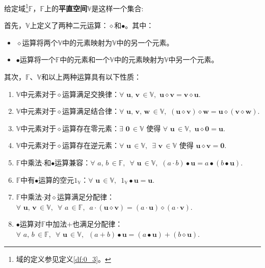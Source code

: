 \documentclass[12pt,UTF8]{ctexbook}
\begin{document}
\begin{df}\label{df:1_1}
给定域\footnote{域的定义参见定义\ref{df:0_3}。}$\mathbb{F}$，$\mathbb{F}$上的\textbf{平直空间}$\mathbb{V}$是这样一个集合:

首先，$\mathbb{V}$上定义了两种二元运算：$\diamond$和$\bullet$。其中：
\begin{itemize}
    \item $\diamond$运算将两个$\mathbb{V}$中的元素映射为$\mathbb{V}$中的另一个元素。
    \item $\bullet$运算将一个$\mathbb{F}$中的元素和一个$\mathbb{V}$中的元素映射为$\mathbb{V}$中另一个元素。
\end{itemize}
其次，$\mathbb{F}$、$\mathbb{V}$和以上两种运算具有以下性质：
\begin{enumerate}
    \item $\mathbb{V}$中元素对于$\diamond$运算满足交换律：$\forall \,\, \mathbf{u}, \, \mathbf{v} \, \in \mathbb{V}, \,\, \mathbf{u} \diamond \mathbf{v} = \mathbf{v} \diamond \mathbf{u}.$
    \item $\mathbb{V}$中元素对于$\diamond$运算满足结合律：$\forall \,\, \mathbf{u}, \, \mathbf{v}, \, \mathbf{w} \, \in \mathbb{V}, \,\, (\mathbf{u} \diamond \mathbf{v}) \diamond \mathbf{w} = \mathbf{u} \diamond (\mathbf{v} \diamond \mathbf{w}).$
    \item $\mathbb{V}$中元素对于$\diamond$运算存在零元素：$\exists \,\, \mathbf{0} \, \in \mathbb{V}$ 使得 $\forall \,\, \mathbf{u} \, \in \mathbb{V}, \,\, \mathbf{u} \diamond \mathbf{0} = \mathbf{u}.$
    \item $\mathbb{V}$中元素对于$\diamond$运算存在逆元素：$\forall \,\, \mathbf{u} \, \in \mathbb{V}, \,\,\, \exists \,\, \mathbf{v} \, \in \mathbb{V}$ 使得 $\mathbf{u} \diamond \mathbf{v} = \mathbf{0}.$
    \item $\mathbb{F}$中乘法$\cdot$和$\bullet$运算兼容：$\forall \,\, a, \, b \, \in \mathbb{F}, \,\,\, \forall \,\, \mathbf{u} \, \in \mathbb{V}, \,\, (a \cdot b)\bullet\mathbf{u} = a \bullet (b\bullet\mathbf{u}).$
    \item $\mathbb{F}$中有$\bullet$运算的空元$1_{\mathbb{V}}$：$\forall \,\, \mathbf{u} \, \in \mathbb{V}, \,\,\, 1_{\mathbb{V}} \bullet \mathbf{u} = \mathbf{u}. $
    \item $\mathbb{F}$中乘法$\cdot$对$\diamond$运算满足分配律：$\forall \,\, \mathbf{u}, \, \mathbf{v} \, \in \mathbb{V}, \,\,\, \forall \,\, a \, \in \mathbb{F}, \,\,\, a\cdot(\mathbf{u} \diamond \mathbf{v}) = (a \cdot \mathbf{u}) \diamond (a \cdot \mathbf{v}). $
    \item $\bullet$运算对$\mathbb{F}$中加法$+$也满足分配律：$\forall \,\, a, \, b \, \in \mathbb{F}, \,\,\, \forall \,\, \mathbf{u} \, \in \mathbb{V}, \,\,\, (a + b)\bullet\mathbf{u} = (a \bullet \mathbf{u}) + (b \diamond \mathbf{u}). $
\end{enumerate}
\end{df}
\end{document}
